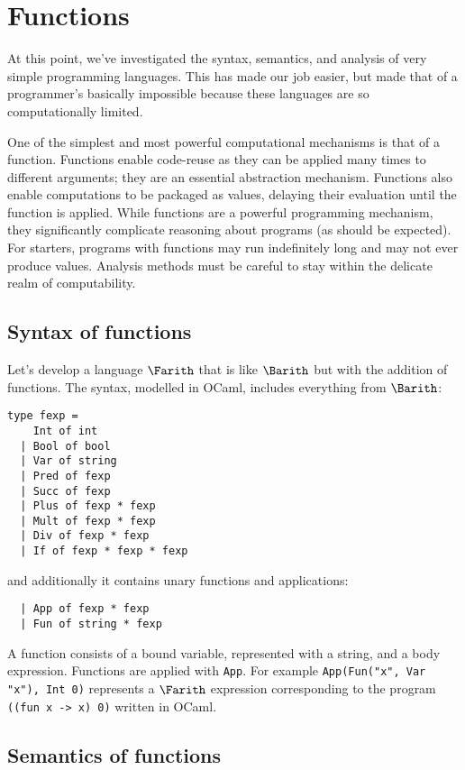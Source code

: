 \newpage
\section{Functions}

At this point, we've investigated the syntax, semantics, and analysis
of very simple programming languages.  This has made our job easier,
but made that of a programmer's basically impossible because these
languages are so computationally limited.

One of the simplest and most powerful computational mechanisms is that
of a function.  Functions enable code-reuse as they can be applied
many times to different arguments; they are an essential abstraction
mechanism.  Functions also enable computations to be packaged as
values, delaying their evaluation until the function is applied.
While functions are a powerful programming mechanism, they
significantly complicate reasoning about programs (as should be
expected).  For starters, programs with functions may run indefinitely
long and may not ever produce values.  Analysis methods must be
careful to stay within the delicate realm of computability.

\subsection{Syntax of functions}

Let's develop a language $\Farith$ that is like $\Barith$ but with the
addition of functions.  The syntax, modelled in OCaml, includes
everything from $\Barith$:
\begin{verbatim}
type fexp = 
    Int of int
  | Bool of bool
  | Var of string
  | Pred of fexp
  | Succ of fexp
  | Plus of fexp * fexp
  | Mult of fexp * fexp
  | Div of fexp * fexp
  | If of fexp * fexp * fexp
\end{verbatim}
and additionally it contains unary functions and applications:
\begin{verbatim}
  | App of fexp * fexp
  | Fun of string * fexp
\end{verbatim}
A function consists of a bound variable, represented with a string,
and a body expression.  Functions are applied with {\tt App}.  For
example {\tt App(Fun("x", Var "x"), Int 0)} represents a $\Farith$
expression corresponding to the program {\tt ((fun x -> x) 0)} written
in OCaml.

\subsection{Semantics of functions}

